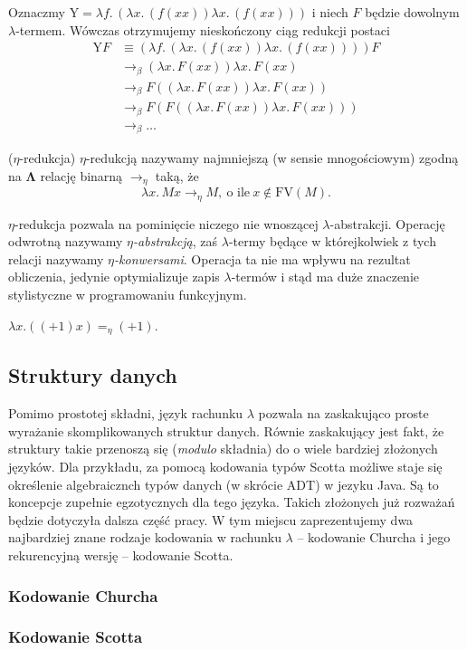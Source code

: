   \begin{przyklad}Oznaczmy \(\mathrm{Y}=\lambda f.\,(\lambda x.\,(f(xx))\lambda x.\,(f(xx)))\) i niech \(F\) będzie dowolnym \(\lambda\)-termem. Wówczas otrzymujemy nieskończony ciąg redukcji postaci
    \begin{align*}
      \mathrm{Y}F &\equiv (\lambda f.\,(\lambda x.\,(f(xx))\lambda x.\,(f(xx))))F\\
                  &\to_\beta (\lambda x.\,F(xx))\lambda x.\,F(xx)\\
                  &\to_\beta F((\lambda x.\,F(xx))\lambda x.\,F(xx))\\
                  &\to_\beta F(F((\lambda x.\,F(xx))\lambda x.\,F(xx)))\\
                  &\to_\beta \dots
    \end{align*}
  \end{przyklad}
\begin{definicja}(\(\eta\)-redukcja)
  \(\eta\)-redukcją nazywamy najmniejszą (w sensie mnogościowym) zgodną na \(\mathbf{\Lambda}\) relację binarną \(\to_\eta\) taką, że
  \[
    \lambda x.\,Mx\to_\eta M,\ \text{o ile}\ x\not\in \mathrm{FV}(M).
  \]

  \(\eta\)-redukcja pozwala na pominięcie niczego nie wnoszącej \(\lambda\)-abstrakcji. Operację odwrotną nazywamy \emph{\(\eta\)-abstrakcją}, zaś \(\lambda\)-termy będące w którejkolwiek z tych relacji nazywamy \emph{\(\eta\)-konwersami}. Operacja ta nie ma wpływu na rezultat obliczenia, jedynie optymializuje zapis \(\lambda\)-termów i stąd ma duże znaczenie stylistyczne w programowaniu funkcyjnym.
  \end{definicja}

  \begin{przyklad}
    \(\lambda x. ((+1) x) =_\eta (+1) \).
  \end{przyklad}

  \subsection{Struktury danych}
Pomimo prostotej składni, język rachunku \(\lambda\) pozwala na zaskakująco proste wyrażanie skomplikowanych struktur danych. Równie zaskakujący jest fakt, że struktury takie przenoszą się (\emph{modulo} składnia) do o wiele bardziej złożonych języków. Dla przykładu, za pomocą kodowania typów Scotta możliwe staje się określenie algebraicznch typów danych (w skrócie ADT) w jezyku Java. Są to koncepcje zupełnie egzotycznych dla tego języka. Takich złożonych już rozważań będzie dotyczyła dalsza część pracy. W tym miejscu zaprezentujemy dwa najbardziej znane rodzaje kodowania w rachunku \(\lambda\) – kodowanie Churcha i jego rekurencyjną wersję -- kodowanie Scotta.
 

 \subsubsection{Kodowanie Churcha}
 \subsubsection{Kodowanie Scotta}
